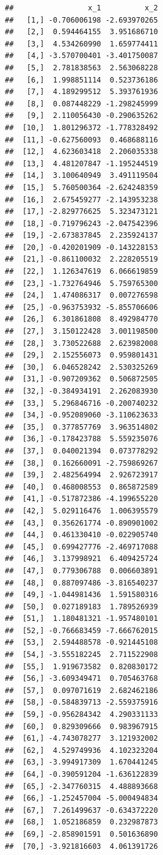 \documentclass[
]{book}
\begin{document}
\begin{verbatim}
##                 x_1          x_2
##   [1,] -0.706006198 -2.693970265
##   [2,]  0.594464155  3.951686710
##   [3,]  4.534260990  1.659774411
##   [4,] -3.570700401 -3.401750087
##   [5,]  2.781838563  2.563068228
##   [6,]  1.998851114  0.523736186
##   [7,]  4.189299512  5.393761936
##   [8,]  0.087448229 -1.298245999
##   [9,]  2.110056430 -0.290635262
##  [10,]  1.801296372 -1.778328492
##  [11,] -0.627560093  0.468688116
##  [12,]  4.623603418  2.206035338
##  [13,]  4.481207847 -1.195244519
##  [14,]  3.100640949  3.491119504
##  [15,]  5.760500364 -2.624248359
##  [16,]  2.675459277 -2.143953238
##  [17,] -2.829776625  5.323473121
##  [18,] -0.719796243 -2.047542396
##  [19,] -2.673837845  2.235924137
##  [20,] -0.420201909 -0.143228153
##  [21,] -0.861100032  2.228205519
##  [22,]  1.126347619  6.066619859
##  [23,] -1.732764946  5.759765300
##  [24,]  1.474086317  0.007276598
##  [25,] -0.963753932 -5.855706606
##  [26,]  6.301861808  8.492984770
##  [27,]  3.150122428  3.001198500
##  [28,]  3.730522688  2.623982008
##  [29,]  2.152556073  0.959801431
##  [30,]  6.046528242  2.530325269
##  [31,] -0.907209362  0.506872505
##  [32,] -0.384934191  2.262083930
##  [33,]  5.296846716 -0.200740232
##  [34,] -0.952089060 -3.110623633
##  [35,]  0.377857769  3.963514802
##  [36,] -0.178423788  5.559235076
##  [37,]  0.040021394  0.073778292
##  [38,]  0.162660091 -2.759869267
##  [39,]  2.482564994  2.926723917
##  [40,]  0.468008553  0.865872589
##  [41,] -0.517872386 -4.199655220
##  [42,]  5.029116476  1.006395579
##  [43,]  0.356261774 -0.890901002
##  [44,]  0.461330410 -0.022905740
##  [45,]  0.699427776 -2.469717088
##  [46,]  3.137998921  6.409425724
##  [47,]  0.779306788  0.006603891
##  [48,]  0.887097486 -3.816540237
##  [49,] -1.044981436  1.591580316
##  [50,]  0.027189183  1.789526939
##  [51,]  1.180481321 -1.957480101
##  [52,] -0.766683459 -7.666762015
##  [53,]  2.594488578 -0.921445108
##  [54,] -3.555182245  2.711522908
##  [55,]  1.919673582  0.820830172
##  [56,] -3.609349471  0.705463768
##  [57,]  0.097071619  2.682462186
##  [58,] -0.584839713 -2.559375916
##  [59,] -0.956284342  4.290331133
##  [60,]  0.829309666  0.983967915
##  [61,] -4.743078277  3.121932002
##  [62,]  4.529749936  4.102323204
##  [63,] -3.994917309  1.670441245
##  [64,] -0.390591204 -1.636122839
##  [65,] -2.347760315  4.488893668
##  [66,] -1.252457004 -5.000494834
##  [67,]  7.261499637 -0.634372220
##  [68,]  1.052186859  0.232987873
##  [69,] -2.858901591  0.501636890
##  [70,] -3.921816603  4.061391726

\end{verbatim}
\end{document}
